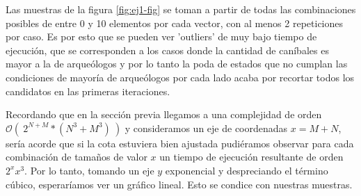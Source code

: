 Las muestras de la figura \ref{fig:ej1-fig} se toman a partir de todas las combinaciones posibles de entre 0 y 10 elementos por cada vector, con al menos 2 repeticiones por caso. Es por esto que se pueden ver 'outliers' de muy bajo tiempo de ejecución, que se corresponden a los casos donde la cantidad de caníbales es mayor a la de arqueólogos y por lo tanto la poda de estados que no cumplan las condiciones de mayoría de arqueólogos por cada lado acaba por recortar todos los candidatos en las primeras iteraciones. 

Recordando que en la sección previa llegamos a una complejidad de orden $ \mathcal{O}(\ 2^{N+M}*(N^3+M^3)\ )$ y consideramos un eje de coordenadas $x = M + N$, sería acorde que si la cota estuviera bien ajustada pudiéramos observar para cada combinación de tamaños de valor $x$ un tiempo de ejecución resultante de orden $ 2^{x}x^3 $. Por lo tanto, tomando un eje $y$ exponencial y despreciando el término cúbico, esperaríamos ver un gráfico lineal. Esto se condice con nuestras muestras.

